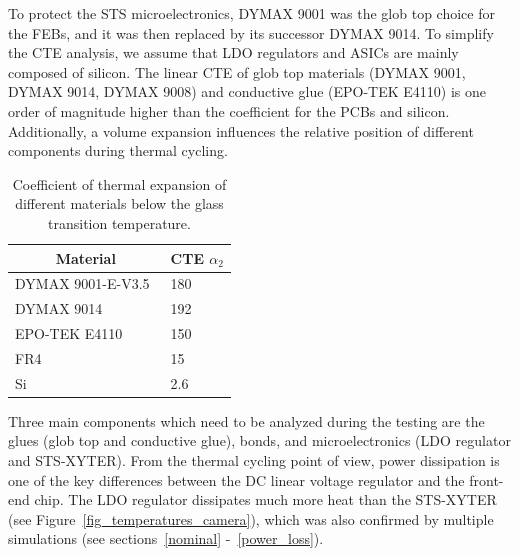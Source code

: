 To protect the STS microelectronics, DYMAX 9001 was the glob top choice for the \glspl{FEB}, and it was then replaced by its successor DYMAX 9014. To simplify the CTE analysis, we assume that \gls{LDO} regulators and \glspl{ASIC} are mainly composed of silicon. The linear CTE of glob top materials (DYMAX 9001, DYMAX 9014, DYMAX 9008) and conductive glue (EPO-TEK E4110) is one order of magnitude higher than the coefficient for the \glspl{PCB} and silicon. Additionally, a volume expansion influences the relative position of different components during thermal cycling.

\begin{table}[!h]
\begin{center}
\caption{Coefficient of thermal expansion of different materials below the glass transition temperature.}
\begin{tabular}{ll}
\hline
\multicolumn{1}{c}{Material} & \multicolumn{1}{c}{CTE $\alpha_{2}$} [\si{\micro\metre\per\metre\per\celsius]}] \\ \hline
DYMAX 9001-E-V3.5~\cite{9001}            & 180                                  \\
DYMAX 9014~\cite{9014}                   & 192                                  \\
EPO-TEK E4110~\cite{4110}                & 150                                  \\ \hline
FR4~\cite{FR4}                          & 15                                   \\
Si~\cite{Si}                           & 2.6                                 
\end{tabular}
\label{TCE}
\end{center}
\end{table}
 \newpage
Three main components which need to be analyzed during the testing are the glues (glob top and conductive glue), bonds, and microelectronics (LDO regulator and STS-XYTER). From the thermal cycling point of view, power dissipation is one of the key differences between the DC linear voltage regulator and the front-end chip. The \gls{LDO} regulator dissipates much more heat than the STS-XYTER (see Figure~\ref{fig_temperatures_camera}), which was also confirmed by multiple simulations (see sections~\ref{nominal} -~\ref{power_loss}).

